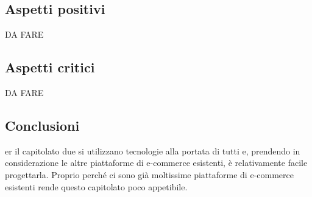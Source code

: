 \subsection{Aspetti positivi}
DA FARE
\subsection{Aspetti critici}
DA FARE
\subsection{Conclusioni}
er il capitolato due si utilizzano tecnologie alla portata di tutti e, prendendo in considerazione le altre piattaforme di e-commerce esistenti, è relativamente facile progettarla. Proprio perché ci sono già moltissime piattaforme di e-commerce esistenti rende questo capitolato poco appetibile.
